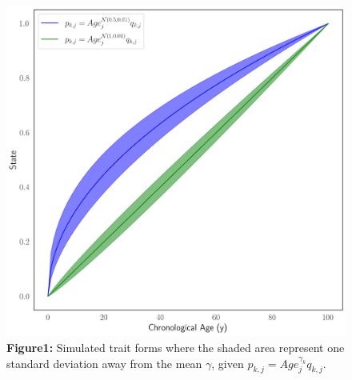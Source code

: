 \documentclass{article}
\begin{document}
{\begin{center}
    \begin{figure}
    \includegraphics[scale=.4]{Figures/Figure1.png}    
    \footnotesize
    \caption*{\small \textbf{Figure1:} Simulated trait forms where the shaded area represent one 
    standard deviation away from the mean $\gamma$, given $p_{k,j} = Age_j^{\gamma_{k}} q_{k,j}$.}
    \end{figure}
\end{center}

}
\end{document}
